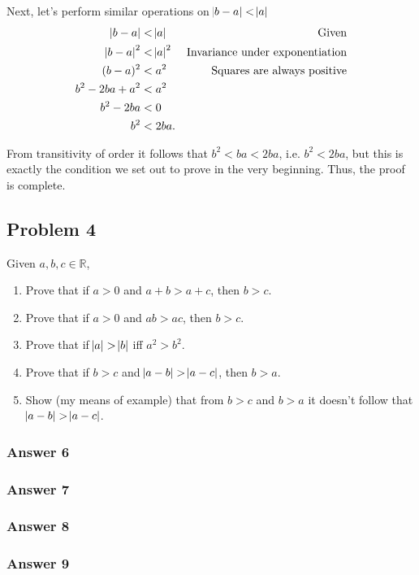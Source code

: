 \documentclass[11pt]{article}
\begin{document}
Next, let's perform similar operations on $\abs{b-a}<\abs{a}$
\begin{equation*}
  \begin{aligned}
    \abs{b - a}     &< \abs{a}
    & \textrm{Given} \\
    \abs{b - a}^2   &< \abs{a}^2
    & \textrm{Invariance under exponentiation} \\
    (b - a)^2       &< a^2
    & \textrm{Squares are always positive} \\
    b^2 - 2ba + a^2 &< a^2 \\
    b^2 - 2ba       &< 0 \\
    b^2             &< 2ba.
    \end{aligned}
\end{equation*}


From transitivity of order it follows that $b^2 < ba < 2ba$, i.e.
$b^2 < 2ba$, but this is exactly the condition we set out to prove in the
very beginning.  Thus, the proof is complete.
\subsection{Problem 4}
\label{sec-1-4}
Given $a, b, c \in \mathbb{R}$,
\begin{enumerate}
\item Prove that if $a > 0$ and $a + b > a + c$, then $b > c$.
\item Prove that if $a > 0$ and $ab > ac$, then $b > c$.
\item Prove that if $\abs{a} > \abs{b}$ iff $a^2 > b^2$.
\item Prove that if $b > c$ and $\abs{a-b} > \abs{a-c}$, then $b > a$.
\item Show (my means of example) that from $b > c$ and $b > a$ it doesn't
follow that $\abs{a-b} > \abs{a-c}$.
\end{enumerate}

\subsubsection{Answer 6}
\label{sec-1-4-1}
\subsubsection{Answer 7}
\label{sec-1-4-2}
\subsubsection{Answer 8}
\label{sec-1-4-3}
\subsubsection{Answer 9}
\label{sec-1-4-4}
\end{document}
